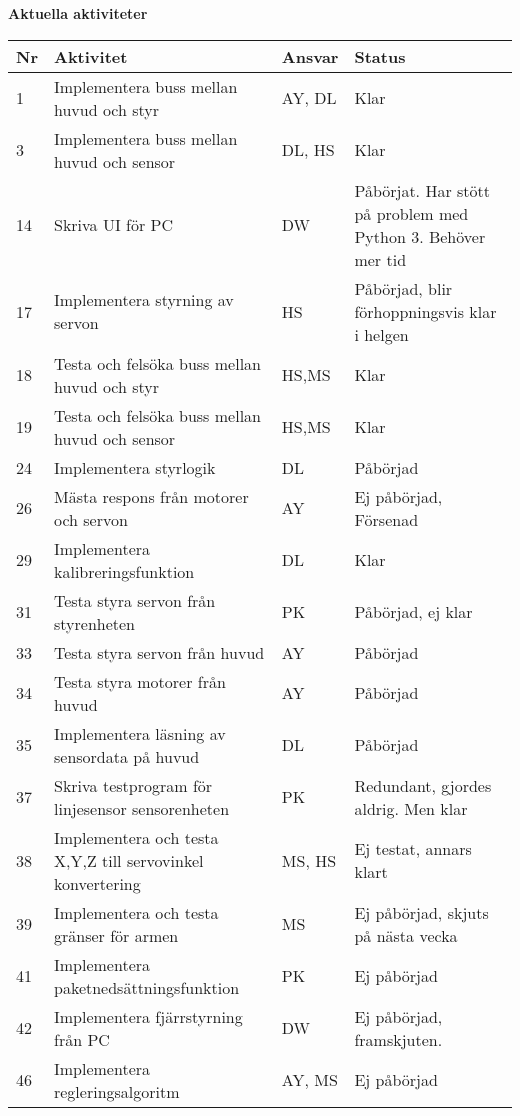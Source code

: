 \documentclass[titlepage, a4paper]{article}
\begin{document}
\newpage
\textbf{\Large Aktuella aktiviteter}
\begin{center}
\begin{tabularx}{\textwidth}{| p{4mm} | X | p{13.5mm} | X |}
	\hline
	\textbf{Nr} & \textbf{Aktivitet} & \textbf{Ansvar} & \textbf{Status} \\\hline
	{1} & {Implementera buss mellan huvud och styr} & {AY, DL} & {Klar} \\\hline
	{3} & {Implementera buss mellan huvud och sensor} & {DL, HS} & {Klar} \\\hline
	{14} & {Skriva UI för PC} & {DW} & {Påbörjat. Har stött på problem med Python 3. Behöver mer tid} \\\hline
	{17} & {Implementera styrning av servon} & {HS} & {Påbörjad, blir förhoppningsvis klar i helgen} \\\hline
	{18} & {Testa och felsöka buss mellan huvud och styr} & {HS,MS} & {Klar} \\\hline
	{19} & {Testa och felsöka buss mellan huvud och sensor} & {HS,MS} & {Klar} \\\hline
	{24} & {Implementera styrlogik} & {DL} & {Påbörjad} \\\hline
	{26} & {Mästa respons från motorer och servon} & {AY} & {Ej påbörjad, Försenad} \\\hline
	{29} & {Implementera kalibreringsfunktion} & {DL} & {Klar} \\\hline
	{31} & {Testa styra servon från styrenheten} & {PK} & {Påbörjad, ej klar} \\\hline
	{33} & {Testa styra servon från huvud} & {AY} & {Påbörjad} \\\hline
	{34} & {Testa styra motorer från huvud} & {AY} & {Påbörjad} \\\hline
	{35} & {Implementera läsning av sensordata på huvud} & {DL} & {Påbörjad} \\\hline
	{37} & {Skriva testprogram för linjesensor sensorenheten} & {PK} & {Redundant, gjordes aldrig. Men klar} \\\hline
	{38} & {Implementera och testa X,Y,Z  till servovinkel konvertering} & {MS, HS} & {Ej testat, annars klart} \\\hline
	{39} & {Implementera och testa gränser för armen} & {MS} & {Ej påbörjad, skjuts på nästa vecka} \\\hline
	{41} & {Implementera paketnedsättningsfunktion} & {PK} & {Ej påbörjad} \\\hline
	{42} & {Implementera fjärrstyrning från PC} & {DW} & {Ej påbörjad, framskjuten.} \\\hline
	{46} & {Implementera regleringsalgoritm} & {AY, MS} & {Ej påbörjad} \\\hline
\end{tabularx}
\end{center}
\end{document}
